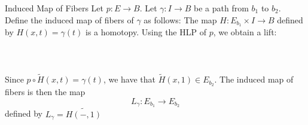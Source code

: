 \documentclass[a4paper]{article}
\begin{document}
\begin{defn}{Induced Map of Fibers}{} Let $p:E\to B$. Let $\gamma:I\to B$ be a path from $b_1$ to $b_2$. Define the induced map of fibers of $\gamma$ as follows: The map $H:E_{b_1}\times I\to B$ defined by $H(x,t)=\gamma(t)$ is a homotopy. Using the HLP of $p$, we obtain a lift: \\~\\
 \\~\\
Since $p\circ\widetilde{H}(x,t)=\gamma(t)$, we have that $\widetilde{H}(x,1)\in E_{b_2}$. The induced map of fibers is then the map $$L_\gamma:E_{b_1}\to E_{b_2}$$ defined by $L_\gamma=\widetilde{H(-,1)}$
\end{defn}
\end{document}
